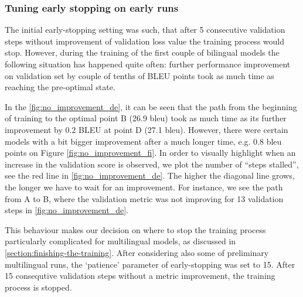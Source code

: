 \subsubsection*{Tuning early stopping on early runs}

The initial \gls{early-stopping} setting was such, that after 5 consecutive
validation steps without improvement of validation \gls{loss} value
the training process would stop.
However, during the training of the first couple of bilingual models
the following situation has happened quite often:
further performance improvement on validation set by
couple of tenths of BLEU points took as much time as reaching
the pre-optimal state.

In the \cref{fig:no_improvement_de}, it  can be seen that the path from
the beginning of training to the optimal point B (26.9 \acrshort{bleu})
took as much time as its further improvement by 0.2 BLEU
at point D (27.1 \acrshort{bleu}). However, there were certain models
with a bit bigger improvement after a much longer time, e.g.
0.8 \acrshort{bleu} points on Figure \ref{fig:no_improvement_fi}.
In order to visually highlight when an increase in the validation score
is observed, we plot the number of ``steps stalled'',
see the red line in \cref{fig:no_improvement_de}.
The higher the diagonal line grows, the longer we have to wait for an improvement.
For instance, we see the path from A to B, where the validation
metric was not improving for 13 validation steps in \cref{fig:no_improvement_de}.

This behaviour makes our decision on where to stop the training process particularly
complicated for multilingual models, as discussed in
\cref{section:finishing-the-training}.
After considering also some of preliminary multilingual runs,
the `patience' parameter of \gls{early-stopping} was set to 15.
After 15 consequtive validation steps without a metric improvement,
the training process is stopped.


